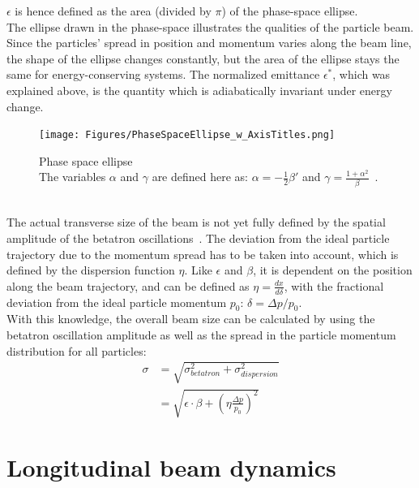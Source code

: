 $\epsilon$ is hence defined as the area (divided by $\pi$) of the phase-space ellipse.\\
The ellipse drawn in the phase-space illustrates the qualities of the particle beam.
Since the particles' spread in position and momentum varies along the beam line, the shape of the ellipse changes constantly, but the area of the ellipse stays the same for energy-conserving systems.
The normalized emittance $\epsilon^*$, which was explained above, is the quantity which is adiabatically invariant under energy change.
\begin{figure}[h]
\centering
\texttt{[image: Figures/PhaseSpaceEllipse\_w\_AxisTitles.png]}
\caption[Phase space ellipse]{Phase space ellipse~\cite[based on p. 158]{Wiedemann}
\\The variables $\alpha$ and $\gamma$ are defined here as: $\alpha = -\frac12\beta'$ and $\gamma = \frac{1+\alpha^2}{\beta}$~\cite[cf. p. 283ff]{Wangler}.}
\label{fig:PhaseSpaceEllipse}
\end{figure}
\\
The actual transverse size of the beam is not yet fully defined by the spatial amplitude of the betatron oscillations~\cite[cf. p. 108ff]{Conte}.
The deviation from the ideal particle trajectory due to the momentum spread has to be taken into account, which is defined by the dispersion function $\eta$.
Like $\epsilon$ and $\beta$, it is dependent on the position along the beam trajectory, and can be defined as $\eta = \frac{dx}{d\delta}$, with the fractional deviation from the ideal particle momentum $p_0$: $\delta = \Delta p/p_0$.
\\
With this knowledge, the overall beam size can be calculated by using the betatron oscillation amplitude as well as the spread in the particle momentum distribution for all particles:
\begin{align}
 \sigma&=\sqrt{\sigma^2_{betatron}+\sigma^2_{dispersion}}\\
 &=\sqrt{\epsilon\cdot\beta+\left(\eta\frac{\Delta p}{p_0}\right)^2}
\end{align}

\section{Longitudinal beam dynamics}
\label{AccPhysics:Bunching}

